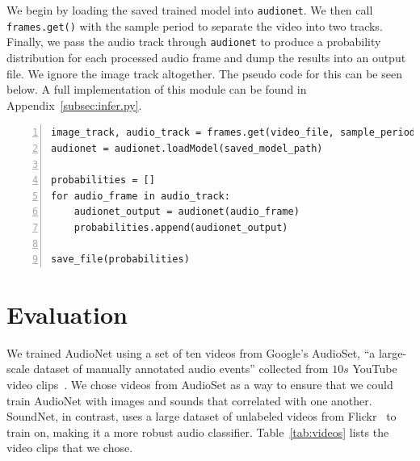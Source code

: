 \documentclass[12pt,twoside]{article}
\theoremstyle{plain}
\theoremstyle{definition}
\theoremstyle{remark}
\begin{document}
\noindent
We begin by loading the saved trained model into \texttt{audionet}.
We then call \texttt{frames.get()} with the sample period to separate the video into two tracks.
Finally, we pass the audio track through \texttt{audionet} to produce a probability distribution for each processed audio frame and dump the results into an output file.
We ignore the image track altogether.
The pseudo code for this can be seen below.
A full implementation of this module can be found in Appendix~\ref{subsec:infer.py}.

{\setlength{\fboxsep}{10pt}
\begin{Verbatim}[frame=leftline, numbers=left, xleftmargin=5mm]
image_track, audio_track = frames.get(video_file, sample_period)
audionet = audionet.loadModel(saved_model_path)

probabilities = []
for audio_frame in audio_track:
    audionet_output = audionet(audio_frame)
    probabilities.append(audionet_output)

save_file(probabilities)
\end{Verbatim}
}


\section{Evaluation}
\label{sec:evaluation}
We trained AudioNet using a set of ten videos from Google’s AudioSet, “a large-scale dataset of manually annotated audio events” collected from $10s$ YouTube video clips~\cite{Gemmeke:Jort:17}.
We chose videos from AudioSet as a way to ensure that we could train AudioNet with images and sounds that correlated with one another.
SoundNet, in contrast, uses a large dataset of unlabeled videos from Flickr~\cite{flickr} to train on, making it a more robust audio classifier.
Table~\ref{tab:videos} lists the video clips that we chose.
\end{document}
